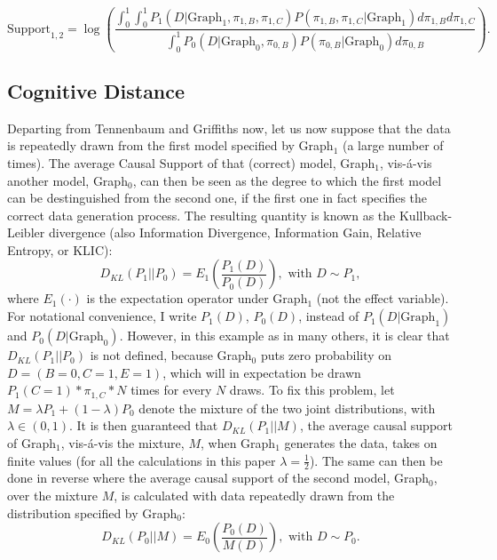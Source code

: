 \documentclass[11pt]{article}
\begin{document}
$$\text{Support}_{1,2} = \log\left(\frac{\int_0^1 \int_0^1 P_1(D | \text{Graph}_1, \pi_{1, B}, \pi_{1, C})P(\pi_{1, B}, \pi_{1, C} | \text{Graph}_1) d\pi_{1, B} d\pi_{1, C}}{\int_0^1 P_0(D | \text{Graph}_0, \pi_{0,B}) P(\pi_{0, B} | \text{Graph}_0) d\pi_{0, B}}\right).$$
\subsection{Cognitive Distance}
\label{sec-3-2}


Departing from Tennenbaum and Griffiths now, let us now suppose that the data is repeatedly drawn from the first model specified by Graph$_1$ (a large number of times). The average Causal Support of that (correct) model, Graph$_1$, vis-\'a-vis another model, Graph$_0$, can then be seen as the degree to which the first model can be destinguished from the second one, if the first one in fact specifies the correct data generation process. The resulting quantity is known as the Kullback-Leibler divergence (also Information Divergence, Information Gain, Relative Entropy, or KLIC):
$$D_{KL}(P_1 | | P_0)=E_1\left(\frac{P_1(D)}{P_0(D)}\right), \text{ with } D\sim P_1,$$
where $E_1(\cdot)$ is the expectation operator under Graph$_1$ (not the effect variable). For notational convenience, I write $P_1(D)$, $P_0(D)$, instead of $P_1(D | \text{Graph}_1)$ and $P_0(D | \text{Graph}_0)$. However, in this example as in many others, it is clear that $D_{KL}(P_1 | | P_0)$ is not defined, because Graph$_0$ puts zero probability on $D=(B=0, C=1, E=1)$, which will in expectation be drawn $P_1(C=1)*\pi_{1, C}*N$ times for every $N$ draws. To fix this problem, let $M=\lambda P_1 + (1-\lambda) P_0$ denote the mixture of the two joint distributions, with $\lambda \in (0, 1)$. It is then guaranteed that $D_{KL}(P_1 | | M)$, the average causal support of Graph$_1$, vis-\'a-vis the mixture, $M$, when Graph$_1$ generates the data, takes on finite values (for all the calculations in this paper $\lambda =\frac{1}{2}$). The same can then be done in reverse where the average causal support of the second model, Graph$_0$, over the mixture $M$, is calculated with data repeatedly drawn from the distribution specified by Graph$_0$:
$$D_{KL}(P_0 | | M)=E_0\left(\frac{P_0(D)}{M(D)}\right), \text{ with } D\sim P_0.$$
\end{document}
